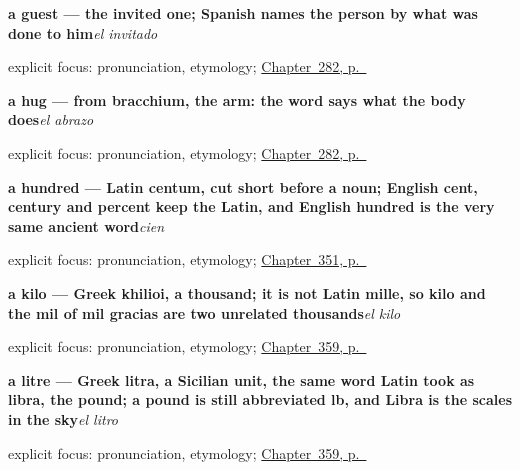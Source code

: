 \noindent\begin{minipage}[t]{\linewidth}
\raggedright
\textbf{a guest — the invited one; Spanish names the person by what was done to him}\enspace\emph{el invitado}\par
\footnotesize explicit focus: pronunciation, etymology; \hyperref[ch:encuentro]{Chapter~282, p.~\pageref*{ch:encuentro}}
\end{minipage}\par\smallskip

\noindent\begin{minipage}[t]{\linewidth}
\raggedright
\textbf{a hug — from bracchium, the arm: the word says what the body does}\enspace\emph{el abrazo}\par
\footnotesize explicit focus: pronunciation, etymology; \hyperref[ch:encuentro]{Chapter~282, p.~\pageref*{ch:encuentro}}
\end{minipage}\par\smallskip

\noindent\begin{minipage}[t]{\linewidth}
\raggedright
\textbf{a hundred — Latin centum, cut short before a noun; English cent, century and percent keep the Latin, and English hundred is the very same ancient word}\enspace\emph{cien}\par
\footnotesize explicit focus: pronunciation, etymology; \hyperref[ch:cien-y-la-cantidad]{Chapter~351, p.~\pageref*{ch:cien-y-la-cantidad}}
\end{minipage}\par\smallskip

\noindent\begin{minipage}[t]{\linewidth}
\raggedright
\textbf{a kilo — Greek khilioi, a thousand; it is not Latin mille, so kilo and the mil of mil gracias are two unrelated thousands}\enspace\emph{el kilo}\par
\footnotesize explicit focus: pronunciation, etymology; \hyperref[ch:el-kilo-y-el-litro]{Chapter~359, p.~\pageref*{ch:el-kilo-y-el-litro}}
\end{minipage}\par\smallskip

\noindent\begin{minipage}[t]{\linewidth}
\raggedright
\textbf{a litre — Greek litra, a Sicilian unit, the same word Latin took as libra, the pound; a pound is still abbreviated lb, and Libra is the scales in the sky}\enspace\emph{el litro}\par
\footnotesize explicit focus: pronunciation, etymology; \hyperref[ch:el-kilo-y-el-litro]{Chapter~359, p.~\pageref*{ch:el-kilo-y-el-litro}}
\end{minipage}\par\smallskip

